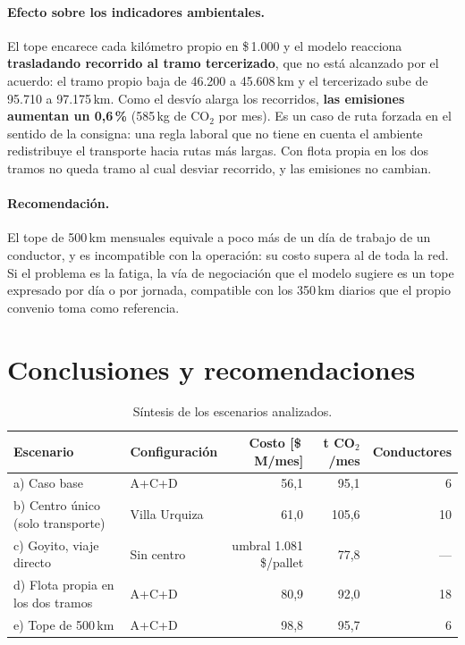 \documentclass[10pt,a4paper]{article}
\begin{document}
\paragraph{Efecto sobre los indicadores ambientales.} El tope encarece cada
kilómetro propio en \$\,1.000 y el modelo reacciona \textbf{trasladando
recorrido al tramo tercerizado}, que no está alcanzado por el acuerdo: el tramo
propio baja de 46.200 a 45.608\,km y el tercerizado sube de 95.710 a
97.175\,km. Como el desvío alarga los recorridos, \textbf{las emisiones
aumentan un 0,6\,\%} (585\,kg de CO$_2$ por mes). Es un caso de ruta forzada en
el sentido de la consigna: una regla laboral que no tiene en cuenta el
ambiente redistribuye el transporte hacia rutas más largas. Con flota propia en
los dos tramos no queda tramo al cual desviar recorrido, y las emisiones no
cambian.

\paragraph{Recomendación.} El tope de 500\,km mensuales equivale a poco más de
un día de trabajo de un conductor, y es incompatible con la operación: su
costo supera al de toda la red. Si el problema es la fatiga, la vía de
negociación que el modelo sugiere es un tope expresado por día o por jornada,
compatible con los 350\,km diarios que el propio convenio toma como referencia.

\section{Conclusiones y recomendaciones}
\label{sec:conclusiones}

\begin{table}[H]
\centering\small
\caption{Síntesis de los escenarios analizados.}
\label{tab:sintesis}
\begin{tabular}{llrrr}
\toprule
\textbf{Escenario} & \textbf{Configuración} & \textbf{Costo [\$\,M/mes]} & \textbf{t CO$_2$/mes} & \textbf{Conductores} \\
\midrule
a) Caso base                          & A+C+D        & 56,1  & 95,1  & 6 \\
b) Centro único (solo transporte)     & Villa Urquiza & 61,0  & 105,6 & 10 \\
c) Goyito, viaje directo              & Sin centro   & umbral 1.081 \$/pallet & 77,8 & --- \\
d) Flota propia en los dos tramos     & A+C+D        & 80,9  & 92,0  & 18 \\
e) Tope de 500\,km                    & A+C+D        & 98,8  & 95,7  & 6 \\
\bottomrule
\end{tabular}
\end{table}
\end{document}
